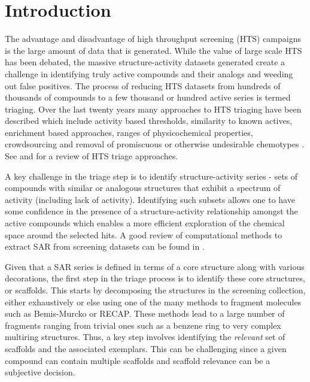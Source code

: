 \documentclass[journal=jacsat,biochem,manuscript=article]{achemso}
\begin{document}
\section{Introduction}

The advantage and disadvantage of high throughput screening (HTS)
campaigns is the large amount of data that is generated. While the
value of large scale HTS has been debated\cite{Macarron:2011qv}, the
massive structure-activity datasets generated create a challenge in
identifying truly active compounds and their analogs and weeding out
false positives. The process of reducing HTS datasets from hundreds of
thousands of compounds to a few thousand or hundred active series is
termed triaging. Over the last twenty years many approaches to HTS
triaging have been described which include activity based
thresholds\cite{Mulrooney:2013aa}, similarity to known
actives\cite{Shanmugasundaram:2005aa}, enrichment based
approaches\cite{Varin2010CSE,Pu:2012wf}, ranges of physicochemical
properties\cite{Cox:2012qy}, crowdsourcing\cite{Peng:2013qp} and
removal of promiscuous or otherwise undesirable chemotypes
\cite{Dahlin:2014fp}. See \citet{Shun:2011sy} and
\citet{Langer:2009mw} for a review of HTS triage approaches.

A key challenge in the triage step is to identify structure-activity
series - sets of compounds with similar or analogous structures that
exhibit a spectrum of activity (including lack of
activity). Identifying such subsets allows one to have some confidence
in the presence of a structure-activity relationship amongst the
active compounds which enables a more efficient exploration of the
chemical space around the selected hits. A good review of
computational methods to extract SAR from screening datasets can be
found in \citet{Wawer2010review}.

Given that a SAR series is defined in terms of a core structure along
with various decorations, the first step in the triage process is to
identify these core structures, or scaffolds. This starts by
decomposing the structures in the screening collection, either exhaustively or
else using one of the many methods to fragment molecules such
as Bemis-Murcko\cite{BemisMurcko1999,BemisMurcko1996} or RECAP\cite{Lewell:1998aa}. These methods lead to a large number of
fragments ranging from trivial ones such as a benzene ring to very complex
multiring structures. Thus, a key step involves identifying the \emph{relevant} set of
scaffolds and the associated exemplars. This can be challenging since a given
compound can contain multiple scaffolds and scaffold relevance can be a subjective decision\cite{Hu:2016aa}.
\end{document}
